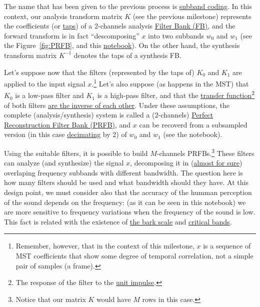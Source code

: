 The name that has been given to the previous process is
\href{https://en.wikipedia.org/wiki/Sub-band_coding}{subband
  coding}. In this context, our analysis transform matrix $K$ (see the
previous milestone) represents the coefficients (or
\href{https://en.wikipedia.org/wiki/Finite_impulse_response}{taps}) of
a 2-channels analysis
\href{https://en.wikipedia.org/wiki/Filter_bank}{Filter Bank (FB)},
and the forward transform is in fact ``descomposing'' $x$ into two subbands
$w_0$ and $w_1$ (see the Figure~\ref{fig:PRFB}, and this
\href{}{notebook}). On the other hand, the synthesis transform matrix
$K^{-1}$ denotes the taps of a synthesis FB.

Let's suppose now that the filters (represented by the taps of) $K_0$
and $K_1$ are applied to the input signal $x$.\footnote{Remember,
  however, that in the context of this milestone, $x$ is a sequence of
  MST coefficients that show some degree of temporal correlation, not
  a simple pair of samples (a frame).} Let's also suppose (as happens
in the MST) that $K_0$ is a low-pass filter and $K_1$ is a high-pass
filter, and that the
\href{https://en.wikipedia.org/wiki/Filter_(signal_processing)#The_transfer_function}{transfer
  function}\footnote{The response of the filter to the
  \href{https://en.wikipedia.org/?title=Unit_impulse&redirect=no}{unit
    impulse}.} of both filters
\href{https://en.wikipedia.org/wiki/Filter_bank#Perfect_reconstruction_filter_banks}{are
  the inverse of each other}. Under these assumptions, the complete
(analysis/synthesis) system is called a (2-channels)
\href{https://en.wikipedia.org/wiki/Filter_bank#Perfect_reconstruction_filter_banks}{Perfect
  Reconstruction Filter Bank (PRFB)}, and $x$ can be recoverd from a
subsampled version (in this case
\href{https://en.wikipedia.org/wiki/Downsampling_(signal_processing)}{decimating}
by 2) of $w_0$ and $w_1$ (see the notebook).

Using the suitable filters, it is possible to build $M$-channels
PRFBs.\footnote{Notice that our matrix $K$ would have $M$ rows in this
  case.} These filters can analyze (and synthesize) the signal $x$,
decomposing it in
(\href{https://en.wikipedia.org/wiki/Low-pass_filter#Ideal_and_real_filters}{almost
  for sure}) overlaping frequency subbands with different
bandwidth. The question here is how many filters should be used and
what bandwidth should they have. At this design point, we must
consider also that the accuracy of the humman perception of the sound
depends on the frequency: (as it can be seen in this notebook) we are
more sensitive to frequency variations when the frequency of the sound
is low. This fact is related with the existence of
\href{https://en.wikipedia.org/wiki/Bark_scale}{the bark scale} and
\href{https://en.wikipedia.org/wiki/Critical_band}{critical bands}.

